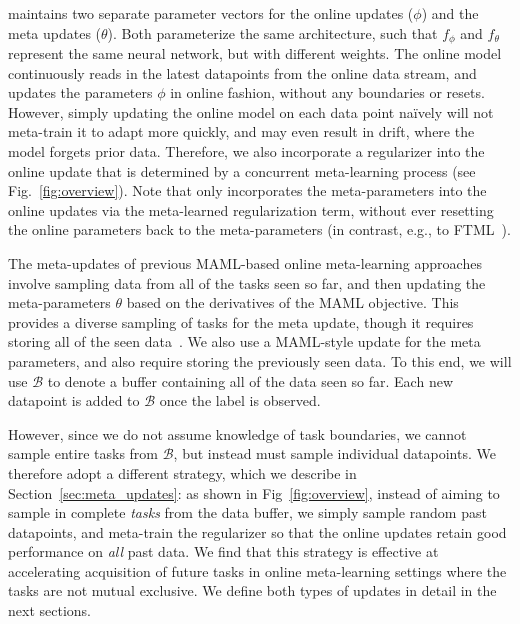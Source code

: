 \ours maintains two separate parameter vectors for the online updates ($\phi$) and the meta updates ($\theta$). Both parameterize the same architecture, such that $f_\phi$ and $f_\theta$ represent the same neural network, but with different weights. The online model continuously reads in the latest datapoints from the online data stream, and updates the parameters $\phi$ in online fashion, without any boundaries or resets. However, simply updating the online model on each data point na\"{i}vely will not meta-train it to adapt more quickly, and may even result in drift, where the model forgets prior data. Therefore, we also incorporate a regularizer into the online update that is determined by a concurrent meta-learning process (see Fig.~\ref{fig:overview}). Note that \ours only incorporates the meta-parameters into the online updates via the meta-learned regularization term, without ever resetting the online parameters back to the meta-parameters (in contrast, e.g., to FTML~\citep{finn19a}).

The meta-updates of previous MAML-based online meta-learning approaches involve sampling data from all of the tasks seen so far, and then updating the meta-parameters $\theta$ based on the derivatives of the MAML objective. This provides a diverse sampling of tasks for the meta update, though it requires storing all of the seen data~\citep{finn19a}. We also use a MAML-style update for the meta parameters, and also require storing the previously seen data. To this end, we will use $\mathcal{B}$ to denote a buffer containing all of the data seen so far. Each new datapoint is added to $\mathcal{B}$ once the label is observed.

However, since we do not assume knowledge of task boundaries, we cannot sample entire tasks from $\mathcal{B}$, but instead must sample individual datapoints. We therefore adopt a different strategy, which we describe in Section~\ref{sec:meta_updates}: as shown in Fig~\ref{fig:overview}, instead of aiming to sample in complete \emph{tasks} from the data buffer, we simply sample random past datapoints, and meta-train the regularizer so that the online updates retain good performance on \emph{all} past data. We find that this strategy is effective at accelerating acquisition of future tasks in online meta-learning settings where the tasks are not mutual exclusive.
We define both types of updates in detail in the next sections.

